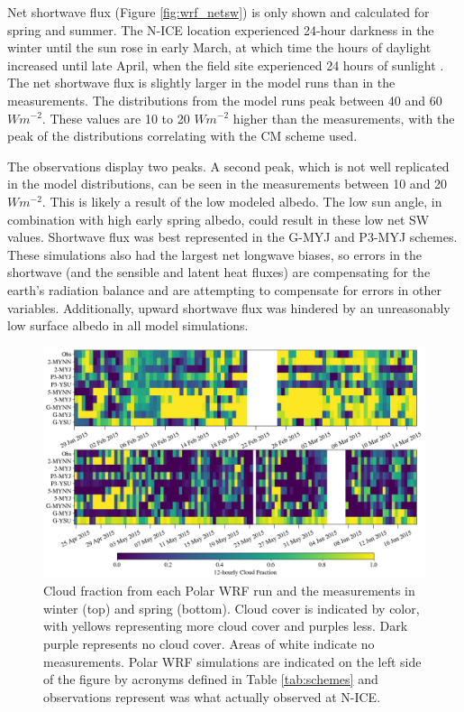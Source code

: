 Net shortwave flux (Figure \ref{fig:wrf_netsw}) is only shown and calculated for spring and summer. The N-ICE location experienced 24-hour darkness in the winter until the sun rose in early March, at which time the hours of daylight increased until late April, when the field site experienced 24 hours of sunlight \citep{walden:2017}. The net shortwave flux is slightly larger in the model runs than in the measurements. The distributions from the model runs peak between 40 and 60 $Wm^{-2}$. These values are 10 to 20 $Wm^{-2}$ higher than the measurements, with the peak of the distributions correlating with the CM scheme used. 

The observations display two peaks. A second peak, which is not well replicated in the model distributions, can be seen in the measurements between 10 and 20 $Wm^{-2}$. This is likely a result of the low modeled albedo. The low sun angle, in combination with high early spring albedo, could result in these low net SW values. Shortwave flux was best represented in the G-MYJ and P3-MYJ schemes. These simulations also had the largest net longwave biases, so errors in the shortwave (and the sensible and latent heat fluxes) are compensating for the earth's radiation balance and are attempting to compensate for errors in other variables. Additionally, upward shortwave flux was hindered by an unreasonably low surface albedo in all model simulations.

\begin{figure}[t]
    \centering \hspace*{-0.5cm}
    \includegraphics[width=1.1\linewidth]{figures/chapter3/WRF_Clouds.png}
    \caption[Polar WRF simulated cloud fraction.]{Cloud fraction from each Polar WRF run and the measurements in winter (top) and spring (bottom). Cloud cover is indicated by color, with yellows representing more cloud cover and purples less. Dark purple represents no cloud cover. Areas of white indicate no measurements. Polar WRF simulations are indicated on the left side of the figure by acronyms defined in Table \ref{tab:schemes} and observations represent was what actually observed at N-ICE.}
\label{fig:wrf_cloudfrac}
\end{figure}


